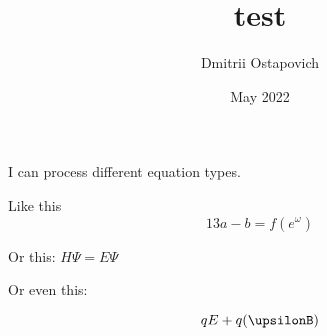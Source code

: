 \documentclass{article}
\title{test}
\author{Dmitrii Ostapovich}
\date{May 2022}
\begin{document}
\maketitle

I can process different equation types.

Like this
$$13a - b = f(e^\omega)$$

Or this: $H\Psi = E\Psi$

Or even this:

\begin{equation}
    qE+q(\upsilonB)
\end{equation}
\end{document}
